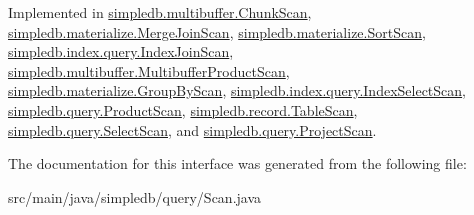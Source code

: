 Implemented in \hyperlink{classsimpledb_1_1multibuffer_1_1ChunkScan_a67b28d9b880f45fe94257b483cc3093a}{simpledb.\+multibuffer.\+Chunk\+Scan}, \hyperlink{classsimpledb_1_1materialize_1_1MergeJoinScan_a557b6b51af330fe0180f639246fa7135}{simpledb.\+materialize.\+Merge\+Join\+Scan}, \hyperlink{classsimpledb_1_1materialize_1_1SortScan_a4180abc890522265c22728e67f2131cd}{simpledb.\+materialize.\+Sort\+Scan}, \hyperlink{classsimpledb_1_1index_1_1query_1_1IndexJoinScan_a5d91dbe6fb77001095d3fc0830bb2d24}{simpledb.\+index.\+query.\+Index\+Join\+Scan}, \hyperlink{classsimpledb_1_1multibuffer_1_1MultibufferProductScan_aec94240353c72bb7eedb60dbe7d3d5e6}{simpledb.\+multibuffer.\+Multibuffer\+Product\+Scan}, \hyperlink{classsimpledb_1_1materialize_1_1GroupByScan_acbe4614c0d8a58cea2cdc86eb964dd8d}{simpledb.\+materialize.\+Group\+By\+Scan}, \hyperlink{classsimpledb_1_1index_1_1query_1_1IndexSelectScan_af642270c5b38d4c87d6a60218660b60e}{simpledb.\+index.\+query.\+Index\+Select\+Scan}, \hyperlink{classsimpledb_1_1query_1_1ProductScan_a5c467cd753d2b088b96b649c7b8cf420}{simpledb.\+query.\+Product\+Scan}, \hyperlink{classsimpledb_1_1record_1_1TableScan_aefc2187ef691253a8d569d01f423c18b}{simpledb.\+record.\+Table\+Scan}, \hyperlink{classsimpledb_1_1query_1_1SelectScan_aefb8c0f74e03179755553ce178f7504d}{simpledb.\+query.\+Select\+Scan}, and \hyperlink{classsimpledb_1_1query_1_1ProjectScan_ae90eaf25301873aba0a2f743becf7c9a}{simpledb.\+query.\+Project\+Scan}.



The documentation for this interface was generated from the following file\+:\begin{DoxyCompactItemize}
\item 
src/main/java/simpledb/query/Scan.\+java\end{DoxyCompactItemize}
